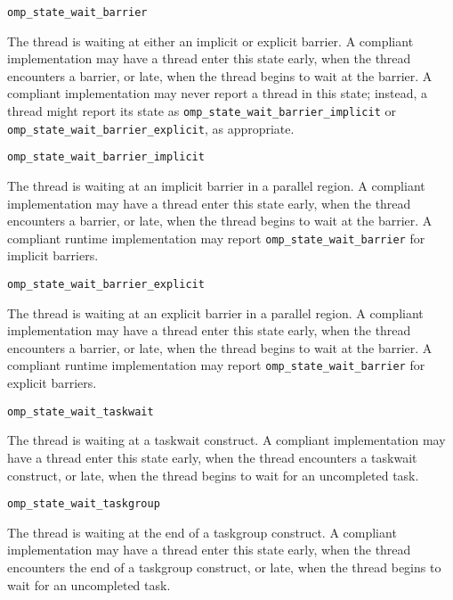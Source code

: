\begin{description}

  \item \verb|omp_state_wait_barrier| 
  
  \sloppy
  The thread is waiting at either an implicit or explicit barrier.
  A  compliant implementation may have a thread enter this state
  early, when the thread encounters a barrier, or late, when the
  thread begins to wait at the barrier. A  compliant implementation may never report a thread in this state; instead, a thread might report its state as \verb|omp_state_wait_barrier_implicit|  or \verb|omp_state_wait_barrier_explicit|, as appropriate.
  
  \item \verb|omp_state_wait_barrier_implicit| 
  
\sloppy
  The thread is waiting at an implicit barrier in a parallel region. 
  A  compliant implementation may have a thread enter this state
  early, when the thread encounters a barrier, or late, when the
  thread begins to wait at the barrier.
  A  compliant runtime implementation may report \verb|omp_state_wait_barrier| for implicit barriers.
  
    \item \verb|omp_state_wait_barrier_explicit| 

  The thread is waiting at an explicit barrier  in a parallel region. 
  A  compliant implementation may have a thread enter this state
  early, when the thread encounters a barrier, or late, when the
  thread begins to wait at the barrier.
  A  compliant runtime implementation may report \verb|omp_state_wait_barrier| for explicit barriers.
  
\end{description}
  

\begin{description}

\item \verb|omp_state_wait_taskwait| 

  The thread is waiting at a taskwait construct. A compliant
  implementation may have a thread enter this state early, when the
  thread encounters a taskwait construct, or late, when the thread
  begins to wait for an uncompleted task.

\item \verb|omp_state_wait_taskgroup| 

  The thread is waiting at the end of a taskgroup construct. A compliant
  implementation may have a thread enter this state early, when the
  thread encounters the end of a taskgroup construct, or late, when the thread
  begins to wait for an uncompleted task.

\end{description}


